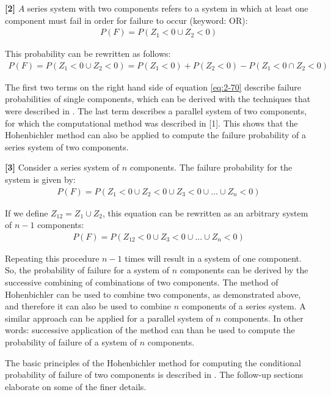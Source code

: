 \textbf{[2]}
$A$ series system with two components refers to a system in which at least one component must fail in order for failure to occur (keyword: OR):
\begin{align}
P(F)=P\left(Z_{1} <0  \cup   Z_{2} <0\right) \label{eq:2-69}  
\end{align}

This probability can be rewritten as follows:
\begin{align}
P(F)=P\left(Z_{1} <0  \cup   Z_{2} <0\right)=P\left(Z_{1} <0\right)+P\left(Z_{2} <0\right)-P\left(Z_{1} <0  \cap  Z_{2} <0\right)  \label{eq:2-70} 
\end{align}

The first two terms on the right hand side of equation \eqref{eq:2-70} describe failure probabilities of single components, which can be derived with the techniques that were described in . The last term describes a parallel system of two components, for which the computational method was described in [1]. This shows that the Hohenbichler method can also be applied to compute the failure probability of a series system of two components.

\textbf{[3]}
Consider a series system of $n$ components. The failure probability for the system is given by: 
\begin{align}
P(F)=P(Z_{1} <0  \cup   Z_{2} <0\cup   Z_{3} <0  \cup ...\cup Z_{n} <0) \label{eq:2-71}
\end{align}

If we define $Z_{12}=Z_1\cup Z_2$, this equation can be rewritten as an arbitrary system of $n-1$ components:
\begin{align}
P(F)=P(Z_{12} <0  \cup   Z_{3} <0  \cup ...\cup Z_{n} <0) \label{eq:2-72}
\end{align}

Repeating this procedure $n-1$ times will result in a system of one component. So, the probability of failure for a system of $n$ components can be derived by the successive combining of combinations of two components. The method of Hohenbichler can be used to combine two components, as demonstrated above, and therefore it can also be used to combine $n$ components of a series system. A similar approach can be applied for a parallel system of $n$ components. In other words: successive application of the method can than be used to compute the probability of failure of a system of $n$ components.

The basic principles of the Hohenbichler method for computing the conditional probability of failure of two components is described in . The follow-up sections elaborate on some of the finer details.

